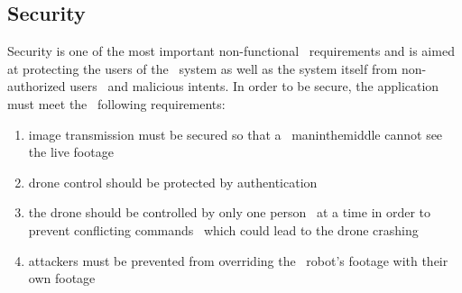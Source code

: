\subsection{Security}
\label{subsec:specification-security}
Security is one of the most important non-functional \
requirements and is aimed at protecting the users of the \
system as well as the system itself from non-authorized users \
and malicious intents.
In order to be secure, the application must meet the \
following requirements:
\begin{enumerate}
    \item image transmission must be secured so that a \
        man\-in\-the\-middle cannot see the live footage
    \item drone control should be protected by authentication
    \item the drone should be controlled by only one person \
        at a time in order to prevent conflicting commands \
        which could lead to the drone crashing
    \item attackers must be prevented from overriding the \
        robot's footage with their own footage
\end{enumerate}
